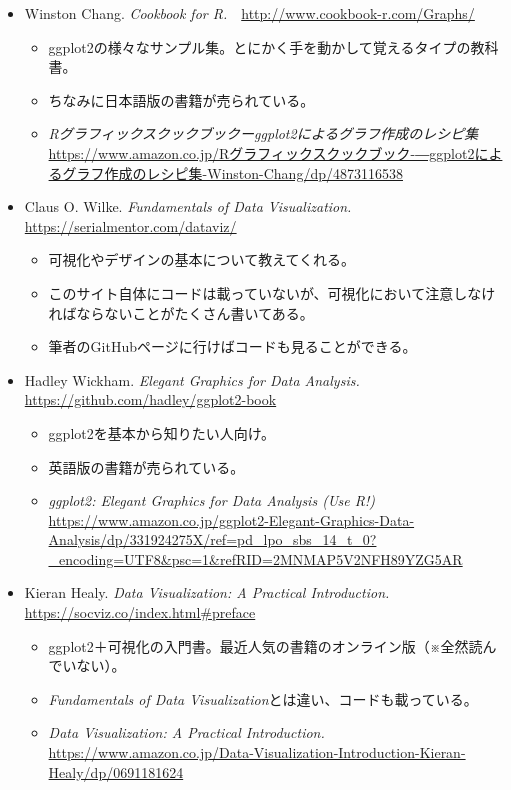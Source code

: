 \documentclass[]{book}
\begin{document}
\begin{itemize}
\item
  Winston Chang. \emph{Cookbook for
  R.}　\url{http://www.cookbook-r.com/Graphs/}

  \begin{itemize}
  \item
    ggplot2の様々なサンプル集。とにかく手を動かして覚えるタイプの教科書。
  \item
    ちなみに日本語版の書籍が売られている。
  \item
    \emph{Rグラフィックスクックブックーggplot2によるグラフ作成のレシピ集}　\url{https://www.amazon.co.jp/Rグラフィックスクックブック-―ggplot2によるグラフ作成のレシピ集-Winston-Chang/dp/4873116538}
  \end{itemize}
\item
  Claus O. Wilke. \emph{Fundamentals of Data
  Visualization.}　\url{https://serialmentor.com/dataviz/}

  \begin{itemize}
  \item
    可視化やデザインの基本について教えてくれる。
  \item
    このサイト自体にコードは載っていないが、可視化において注意しなければならないことがたくさん書いてある。
  \item
    筆者のGitHubページに行けばコードも見ることができる。
  \end{itemize}
\item
  Hadley Wickham. \emph{Elegant Graphics for Data
  Analysis.}　\url{https://github.com/hadley/ggplot2-book}

  \begin{itemize}
  \item
    ggplot2を基本から知りたい人向け。
  \item
    英語版の書籍が売られている。
  \item
    \emph{ggplot2: Elegant Graphics for Data Analysis (Use
    R!)}　\url{https://www.amazon.co.jp/ggplot2-Elegant-Graphics-Data-Analysis/dp/331924275X/ref=pd_lpo_sbs_14_t_0?_encoding=UTF8\&psc=1\&refRID=2MNMAP5V2NFH89YZG5AR}
  \end{itemize}
\item
  Kieran Healy. \emph{Data Visualization: A Practical Introduction.}
  \url{https://socviz.co/index.html\#preface}

  \begin{itemize}
  \item
    ggplot2＋可視化の入門書。最近人気の書籍のオンライン版（※全然読んでいない）。
  \item
    \emph{Fundamentals of Data
    Visualization}とは違い、コードも載っている。
  \item
    \emph{Data Visualization: A Practical Introduction.}
    \url{https://www.amazon.co.jp/Data-Visualization-Introduction-Kieran-Healy/dp/0691181624}
  \end{itemize}
\end{itemize}
\end{document}
